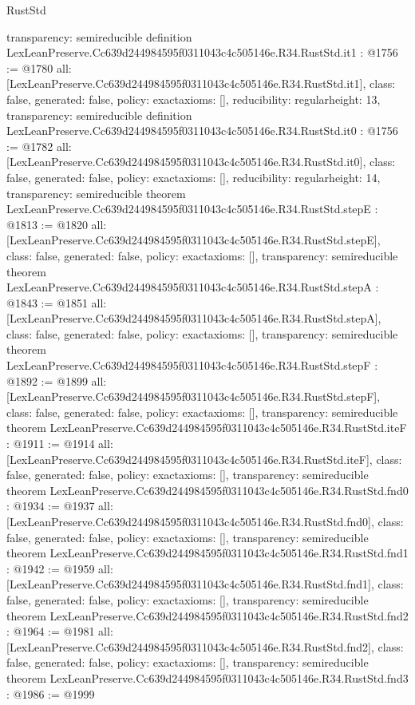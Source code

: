 \begin{lexlean}{RustStd}
\begin{coremodule}
{  transparency: semireducible
}
definition LexLeanPreserve.Cc639d244984595f0311043c4c505146e.R34.RustStd.it1 : @1756 := @1780 {
  all: [LexLeanPreserve.Cc639d244984595f0311043c4c505146e.R34.RustStd.it1],
  class: false,
  generated: false,
  policy: exact{axioms: []},
  reducibility: regular{height: 13},
  transparency: semireducible
}
definition LexLeanPreserve.Cc639d244984595f0311043c4c505146e.R34.RustStd.it0 : @1756 := @1782 {
  all: [LexLeanPreserve.Cc639d244984595f0311043c4c505146e.R34.RustStd.it0],
  class: false,
  generated: false,
  policy: exact{axioms: []},
  reducibility: regular{height: 14},
  transparency: semireducible
}
theorem LexLeanPreserve.Cc639d244984595f0311043c4c505146e.R34.RustStd.stepE : @1813 := @1820 {
  all: [LexLeanPreserve.Cc639d244984595f0311043c4c505146e.R34.RustStd.stepE],
  class: false,
  generated: false,
  policy: exact{axioms: []},
  transparency: semireducible
}
theorem LexLeanPreserve.Cc639d244984595f0311043c4c505146e.R34.RustStd.stepA : @1843 := @1851 {
  all: [LexLeanPreserve.Cc639d244984595f0311043c4c505146e.R34.RustStd.stepA],
  class: false,
  generated: false,
  policy: exact{axioms: []},
  transparency: semireducible
}
theorem LexLeanPreserve.Cc639d244984595f0311043c4c505146e.R34.RustStd.stepF : @1892 := @1899 {
  all: [LexLeanPreserve.Cc639d244984595f0311043c4c505146e.R34.RustStd.stepF],
  class: false,
  generated: false,
  policy: exact{axioms: []},
  transparency: semireducible
}
theorem LexLeanPreserve.Cc639d244984595f0311043c4c505146e.R34.RustStd.iteF : @1911 := @1914 {
  all: [LexLeanPreserve.Cc639d244984595f0311043c4c505146e.R34.RustStd.iteF],
  class: false,
  generated: false,
  policy: exact{axioms: []},
  transparency: semireducible
}
theorem LexLeanPreserve.Cc639d244984595f0311043c4c505146e.R34.RustStd.fnd0 : @1934 := @1937 {
  all: [LexLeanPreserve.Cc639d244984595f0311043c4c505146e.R34.RustStd.fnd0],
  class: false,
  generated: false,
  policy: exact{axioms: []},
  transparency: semireducible
}
theorem LexLeanPreserve.Cc639d244984595f0311043c4c505146e.R34.RustStd.fnd1 : @1942 := @1959 {
  all: [LexLeanPreserve.Cc639d244984595f0311043c4c505146e.R34.RustStd.fnd1],
  class: false,
  generated: false,
  policy: exact{axioms: []},
  transparency: semireducible
}
theorem LexLeanPreserve.Cc639d244984595f0311043c4c505146e.R34.RustStd.fnd2 : @1964 := @1981 {
  all: [LexLeanPreserve.Cc639d244984595f0311043c4c505146e.R34.RustStd.fnd2],
  class: false,
  generated: false,
  policy: exact{axioms: []},
  transparency: semireducible
}
theorem LexLeanPreserve.Cc639d244984595f0311043c4c505146e.R34.RustStd.fnd3 : @1986 := @1999 {
}
\end{coremodule}
\end{lexlean}
